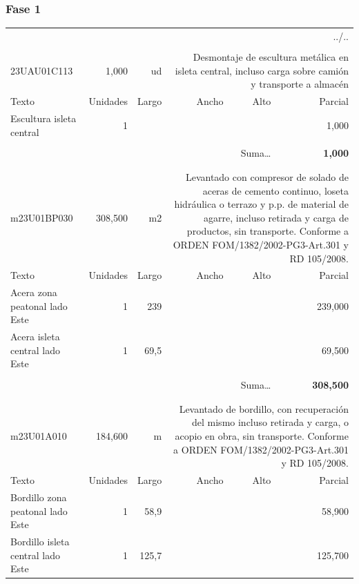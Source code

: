 \documentclass{book}%
\begin{document}
\subsubsection{Fase 1}%
\begin{longtable}{lrrrrr}%
\multicolumn{6}{r}{../..}\\%
\endfoot%
\endlastfoot%
&&&&&\\%
23UAU01C113&     1,000& ud&\multicolumn{3}{p{6cm}}{\scriptsize Desmontaje de escultura metálica en isleta central, incluso carga sobre camión y transporte a almacén\normalsize}\\%
Texto&Unidades&Largo&Ancho&Alto&Parcial\\%
\hline%
\multicolumn{1}{p{3.5cm}}{Escultura isleta central }&1&&&&     1,000\\%
&&&&&\\%
\multicolumn{5}{r}{Suma\ldots}&\textbf{     1,000}\\%
\hline%
&&&&&\\%
&&&&&\\%
m23U01BP030&   308,500& m2&\multicolumn{3}{p{6cm}}{\scriptsize Levantado con compresor de solado de aceras de cemento continuo, loseta hidráulica o terrazo y p.p. de material de agarre, incluso retirada y carga de productos, sin transporte. Conforme a ORDEN FOM/1382/2002-PG3-Art.301 y RD 105/2008.\normalsize}\\%
Texto&Unidades&Largo&Ancho&Alto&Parcial\\%
\hline%
\multicolumn{1}{p{3.5cm}}{Acera  zona peatonal lado Este}&1&239&&&   239,000\\%
\multicolumn{1}{p{3.5cm}}{Acera  isleta central lado Este}&1&69,5&&&    69,500\\%
&&&&&\\%
\multicolumn{5}{r}{Suma\ldots}&\textbf{   308,500}\\%
\hline%
&&&&&\\%
&&&&&\\%
m23U01A010&   184,600& m&\multicolumn{3}{p{6cm}}{\scriptsize Levantado de bordillo, con recuperación del mismo incluso retirada y carga, o acopio en obra, sin transporte. Conforme a ORDEN FOM/1382/2002-PG3-Art.301 y RD 105/2008.\normalsize}\\%
Texto&Unidades&Largo&Ancho&Alto&Parcial\\%
\hline%
\multicolumn{1}{p{3.5cm}}{Bordillo  zona peatonal lado Este}&1&58,9&&&    58,900\\%
\multicolumn{1}{p{3.5cm}}{Bordillo  isleta central lado Este}&1&125,7&&&   125,700\\%

\end{longtable}
\end{document}
